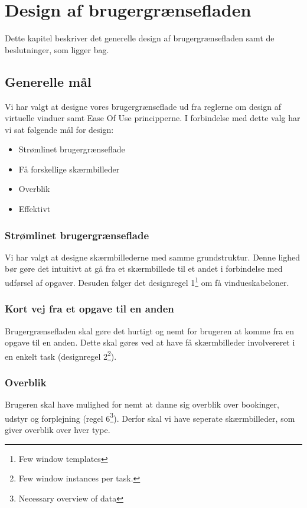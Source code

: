 \chapter{Design af brugergrænsefladen}
\label{Design_G}
Dette kapitel beskriver det generelle design af brugergrænsefladen samt de beslutninger, som ligger bag.

\section{Generelle mål}
\label{Design_G_Goals}
Vi har valgt at designe vores brugergrænseflade ud fra reglerne om design af virtuelle vinduer\cite[s. 169]{SL_UID} samt Ease Of Use principperne\cite[s. 9]{SL_UID}. I forbindelse med dette valg har vi sat følgende mål for design:
\begin{itemize}
\item Strømlinet brugergrænseflade
\item Få forskellige skærmbilleder
\item Overblik
\item Effektivt
\end{itemize}

\subsection{Strømlinet brugergrænseflade}
Vi har valgt at designe skærmbillederne med samme grundstruktur. Denne lighed bør gøre det intuitivt at gå fra et skærmbillede til et andet i forbindelse med udførsel af opgaver. Desuden følger det designregel 1\footnote{Few window templates} om få vindueskabeloner.

\subsection{Kort vej fra et opgave til en anden}
Brugergrænsefladen skal gøre det hurtigt og nemt for brugeren at komme fra en opgave til en anden. Dette skal gøres ved at have få skærmbilleder involvereret i en enkelt task (designregel 2\footnote{Few window instances per task.}).

\subsection{Overblik}
Brugeren skal have mulighed for nemt at danne sig overblik over bookinger, udstyr og forplejning (regel 6\footnote{Necessary overview of data}). Derfor skal vi have seperate skærmbilleder, som giver overblik over hver type.

